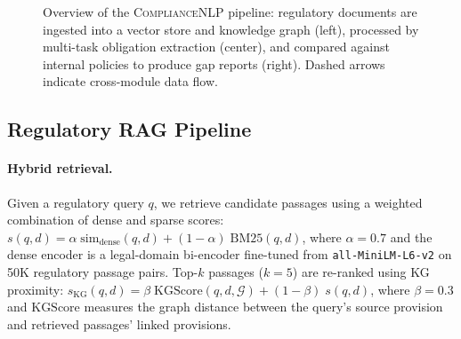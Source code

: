 \documentclass[11pt]{article}
\begin{document}
\begin{figure}[t]
	\caption{Overview of the \textsc{ComplianceNLP} pipeline: regulatory documents are ingested into a vector store and knowledge graph (left), processed by multi-task obligation extraction (center), and compared against internal policies to produce gap reports (right). Dashed arrows indicate cross-module data flow.}
	\label{fig:architecture}
	\vspace{-0.3cm}
\end{figure}

\subsection{Regulatory RAG Pipeline}
\label{sec:rag}

\paragraph{Hybrid retrieval.}  Given a regulatory query $q$, we retrieve candidate passages using a weighted combination of dense and sparse scores: $s(q,d) = \alpha\;\text{sim}_{\text{dense}}(q,d) + (1{-}\alpha)\;\text{BM25}(q,d)$,
where $\alpha{=}0.7$ and the dense encoder is a legal-domain bi-encoder fine-tuned from \texttt{all-MiniLM-L6-v2} on 50K regulatory passage pairs. Top-$k$ passages ($k{=}5$) are re-ranked using KG proximity: $s_{\text{KG}}(q,d) = \beta\;\text{KGScore}(q,d,\mathcal{G}) + (1{-}\beta)\;s(q,d)$, where $\beta{=}0.3$ and $\text{KGScore}$ measures the graph distance between the query's source provision and retrieved passages' linked provisions.
\end{document}

